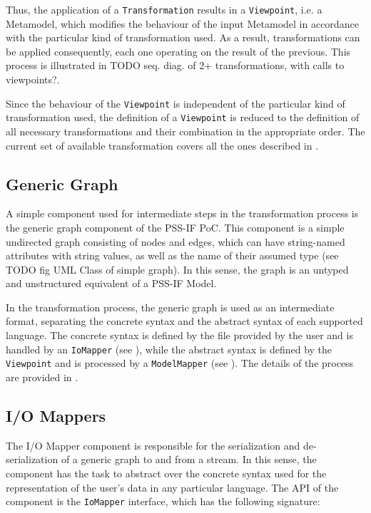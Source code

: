 Thus, the application of a \texttt{Transformation} results in a \texttt{Viewpoint}, i.e. a Metamodel, which modifies the behaviour of the input Metamodel in accordance with the particular kind of transformation used. As a result, transformations can be applied consequently, each one operating on the result of the previous. This process is illustrated in \color{red} TODO seq. diag. of 2+ transformations, with calls to viewpoints?\color{black}.

Since the behaviour of the \texttt{Viewpoint} is independent of the particular kind of transformation used, the definition of a \texttt{Viewpoint} is reduced to the definition of all necessary transformations and their combination in the appropriate order. The current set of available transformation covers all the ones described in .

\subsection{Generic Graph}

A simple component used for intermediate steps in the transformation process is the generic graph component of the PSS-IF PoC. This component is a simple undirected graph consisting of nodes and edges, which can have string-named attributes with string values, as well as the name of their assumed type (see \color{red}TODO fig UML Class of simple graph\color{black}). In this sense, the graph is an untyped and unstructured equivalent of a PSS-IF Model.

In the transformation process, the generic graph is used as an intermediate format, separating the concrete syntax and the abstract syntax of each supported language. The concrete syntax is defined by the file provided by the user and is handled by an \texttt{IoMapper} (see ), while the abstract syntax is defined by the \texttt{Viewpoint} and is processed by a \texttt{ModelMapper} (see ). The details of the process are provided in .

\subsection{I/O Mappers}
\label{sec:impl:comp:io}

The I/O Mapper component is responsible for the serialization and de-serialization of a generic graph to and from a stream. In this sense, the component has the task to abstract over the concrete syntax used for the representation of the user's data in any particular language. The API of the component is the \texttt{IoMapper} interface, which has the following signature:

